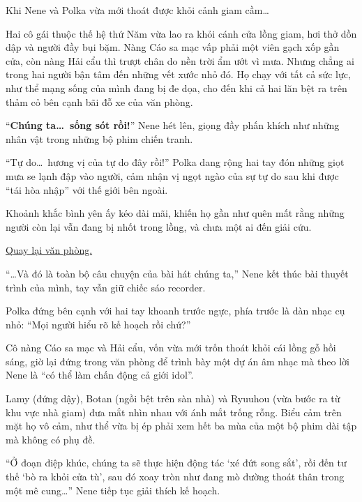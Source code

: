 \documentclass[../main.tex]{subfiles}
\begin{document}

\omk

Khi Nene và Polka vừa mới thoát được khỏi cảnh giam cầm\dots

Hai cô gái thuộc thế hệ thứ Năm vừa lao ra khỏi cánh cửa lồng giam, hơi thở dồn dập và người đầy bụi bặm. Nàng Cáo sa mạc vấp phải một viên gạch xốp gần cửa, còn nàng Hải cẩu thì trượt chân do nền trời ẩm ướt vì mưa. Nhưng chẳng ai trong hai người bận tâm đến những vết xước nhỏ đó. Họ chạy với tất cả sức lực, như thể mạng sống của mình đang bị đe dọa, cho đến khi cả hai lăn bệt ra trên thảm cỏ bên cạnh bãi đỗ xe của văn phòng.


``\textbf{Chúng ta\dots\ sống sót rồi!}'' Nene hét lên, giọng đầy phấn khích như những nhân vật trong những bộ phim chiến tranh.

``Tự do\dots\ hương vị của tự do đây rồi!'' Polka dang rộng hai tay đón những giọt mưa se lạnh đập vào người, cảm nhận vị ngọt ngào của sự tự do sau khi được ``tái hòa nhập'' với thế giới bên ngoài.

Khoảnh khắc bình yên ấy kéo dài mãi, khiến họ gần như quên mất rằng những người còn lại vẫn đang bị nhốt trong lồng, và chưa một ai đến giải cứu.

\begin{center}
  \uline{Quay lại văn phòng.}
\end{center}

``\dots Và đó là toàn bộ câu chuyện của bài hát chúng ta,'' Nene kết thúc bài thuyết trình của mình, tay vẫn giữ chiếc sáo recorder.

Polka đứng bên cạnh với hai tay khoanh trước ngực, phía trước là dàn nhạc cụ nhỏ: ``Mọi người hiểu rõ kế hoạch rồi chứ?''

Cô nàng Cáo sa mạc và Hải cẩu, vốn vừa mới trốn thoát khỏi cái lồng gỗ hồi sáng, giờ lại đứng trong văn phòng để trình bày một dự án âm nhạc mà theo lời Nene là ``có thể làm chấn động cả giới idol''.


Lamy (đứng dậy), Botan (ngồi bệt trên sàn nhà) và Ryuuhou (vừa bước ra từ khu vực nhà giam) đưa mắt nhìn nhau với ánh mắt trống rỗng. Biểu cảm trên mặt họ vô cảm, như thể vừa bị ép phải xem hết ba mùa của một bộ phim dài tập mà không có phụ đề.

``Ở đoạn điệp khúc, chúng ta sẽ thực hiện động tác `xé đứt song sắt', rồi đến tư thế `bò ra khỏi cửa tù', sau đó xoay tròn như đang mò đường thoát thân trong một mê cung\dots'' Nene tiếp tục giải thích kế hoạch.
\end{document}
